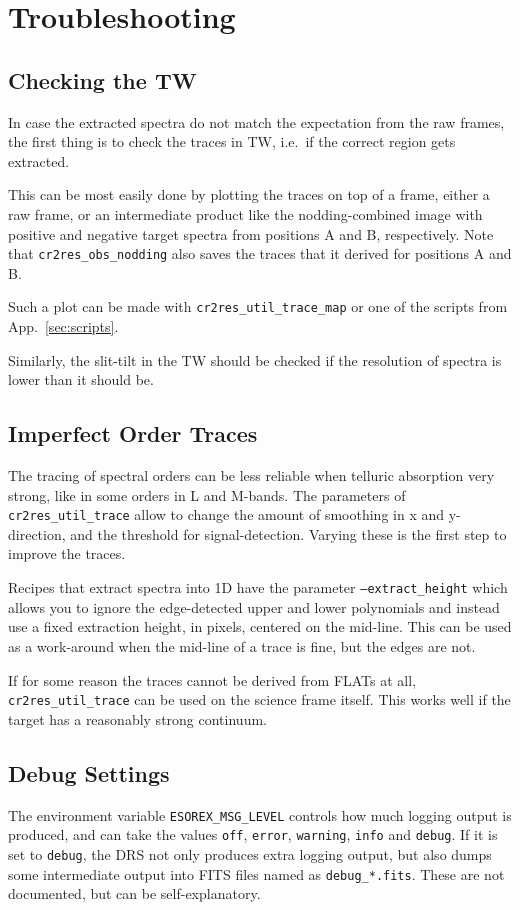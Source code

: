 \section{Troubleshooting}
\label{sec:troubleshooting}



\subsection{Checking the TW}

In case the extracted spectra do not match the expectation from the raw frames,
the first thing is to check the traces in TW, i.e.~if the correct region gets
extracted.

This can be most easily done by plotting the traces on top of a
frame, either a raw frame, or an intermediate product like the nodding-combined
image with positive and negative target spectra from positions A and B,
respectively. Note that \texttt{cr2res\_obs\_nodding} also saves the traces that it derived for positions A and B.

Such a plot can be made with \texttt{cr2res\_util\_trace\_map} or one of the
scripts from App.~\ref{sec:scripts}.

Similarly, the slit-tilt in the TW should be checked if the resolution of
spectra is lower than it should be.


\subsection{Imperfect Order Traces}

The tracing of spectral orders can be less reliable when telluric absorption
very strong, like in some orders in L and M-bands. The parameters of
\texttt{cr2res\_util\_trace} allow to change the amount of smoothing in x and
y-direction, and the threshold for signal-detection. Varying these is the first
step to improve the traces.

Recipes that extract spectra into 1D have the parameter
\texttt{--extract\_height} which allows you to ignore the edge-detected upper
and lower polynomials and instead use a fixed extraction height, in pixels,
centered on the mid-line. This can be used as a work-around when the mid-line of
a trace is fine, but the edges are not.

If for some reason the traces cannot be derived from FLATs at all,
\texttt{cr2res\_util\_trace} can be used on the science frame itself. This works
well if the target has a reasonably strong continuum.

\subsection{Debug Settings}

The environment variable \texttt{ESOREX\_MSG\_LEVEL} controls how much logging
output is produced, and can take the values \texttt{off}, \texttt{error},
\texttt{warning}, \texttt{info} and \texttt{debug}. If it is set to
\texttt{debug}, the DRS not only produces extra logging output, but also dumps
some intermediate output into FITS files named as \texttt{debug\_*.fits}. These
are not documented, but can be self-explanatory.